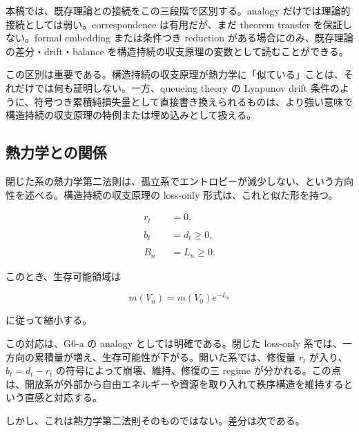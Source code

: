 \documentclass[12pt,a4paper]{article}
\begin{document}
本稿では、既存理論との接続をこの三段階で区別する。analogy だけでは理論的接続としては弱い。correspondence は有用だが、まだ theorem transfer を保証しない。formal embedding または条件つき reduction がある場合にのみ、既存理論の差分・drift・balance を構造持続の収支原理の変数として読むことができる。

この区別は重要である。構造持続の収支原理が熱力学に「似ている」ことは、それだけでは何も証明しない。一方、queueing theory の Lyapunov drift 条件のように、符号つき累積純損失量として直接書き換えられるものは、より強い意味で構造持続の収支原理の特例または埋め込みとして扱える。

\subsection{熱力学との関係}\label{ux71b1ux529bux5b66ux3068ux306eux95a2ux4fc2}

閉じた系の熱力学第二法則は、孤立系でエントロピーが減少しない、という方向性を述べる。構造持続の収支原理の loss-only 形式は、これと似た形を持つ。

\[
\begin{aligned}
r_{t}&=0, \\
\qquad \\
b_{t}&=d_{t}\ge 0, \\
\qquad \\
B_{n}&=L_{n}\ge 0.
\end{aligned}
\]

このとき、生存可能領域は

\[
m(V_{n})=m(V_0)e^{-L_{n}}
\]

に従って縮小する。

この対応は、G6-a の analogy としては明確である。閉じた loss-only 系では、一方向の累積量が増え、生存可能性が下がる。開いた系では、修復量 \(r_{t}\) が入り、\(b_{t}=d_{t}-r_{t}\) の符号によって崩壊、維持、修復の三 regime が分かれる。この点は、開放系が外部から自由エネルギーや資源を取り入れて秩序構造を維持するという直感と対応する。

しかし、これは熱力学第二法則そのものではない。差分は次である。
\end{document}
